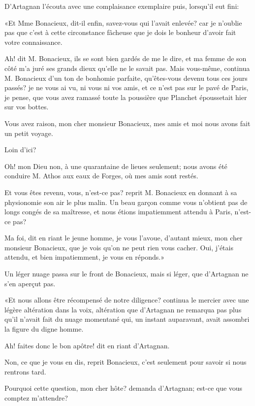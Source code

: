 D'Artagnan l'écouta avec une complaisance exemplaire puis, lorsqu'il eut fini: 

«Et Mme Bonacieux, dit-il enfin, savez-vous qui l'avait enlevée? car je n'oublie pas que c'est à cette circonstance fâcheuse que je dois le bonheur d'avoir fait votre connaissance. 

\speak  Ah! dit M. Bonacieux, ils se sont bien gardés de me le dire, et ma femme de son côté m'a juré ses grands dieux qu'elle ne le savait pas. Mais vous-même, continua M. Bonacieux d'un ton de bonhomie parfaite, qu'êtes-vous devenu tous ces jours passés? je ne vous ai vu, ni vous ni vos amis, et ce n'est pas sur le pavé de Paris, je pense, que vous avez ramassé toute la poussière que Planchet époussetait hier sur vos bottes. 

\speak  Vous avez raison, mon cher monsieur Bonacieux, mes amis et moi nous avons fait un petit voyage. 

\speak  Loin d'ici? 

\speak  Oh! mon Dieu non, à une quarantaine de lieues seulement; nous avons été conduire M. Athos aux eaux de Forges, où mes amis sont restés. 

\speak  Et vous êtes revenu, vous, n'est-ce pas? reprit M. Bonacieux en donnant à sa physionomie son air le plus malin. Un beau garçon comme vous n'obtient pas de longs congés de sa maîtresse, et nous étions impatiemment attendu à Paris, n'est-ce pas? 

\speak  Ma foi, dit en riant le jeune homme, je vous l'avoue, d'autant mieux, mon cher monsieur Bonacieux, que je vois qu'on ne peut rien vous cacher. Oui, j'étais attendu, et bien impatiemment, je vous en réponds.» 

Un léger nuage passa sur le front de Bonacieux, mais si léger, que d'Artagnan ne s'en aperçut pas. 

«Et nous allons être récompensé de notre diligence? continua le mercier avec une légère altération dans la voix, altération que d'Artagnan ne remarqua pas plus qu'il n'avait fait du nuage momentané qui, un instant auparavant, avait assombri la figure du digne homme. 

\speak  Ah! faites donc le bon apôtre! dit en riant d'Artagnan. 

\speak  Non, ce que je vous en dis, reprit Bonacieux, c'est seulement pour savoir si nous rentrons tard. 

\speak  Pourquoi cette question, mon cher hôte? demanda d'Artagnan; est-ce que vous comptez m'attendre? 

